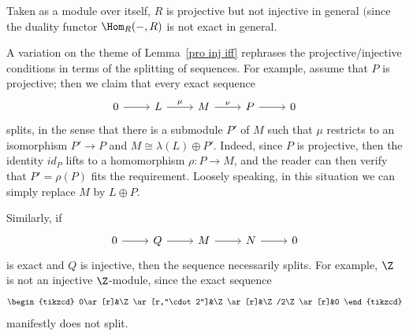 \begin{remark}
Taken as a module over itself, $R$ is projective but not injective in general $($since the duality functor $\Hom_R(-,R)$ is not exact in general.
\end{remark}
A variation on the theme of Lemma~\ref{pro inj iff} rephrases the projective/injective conditions
in terms of the splitting of sequences. For example, assume that $P$ is projective; then we claim that every exact sequence
\[\begin{tikzcd}
0\ar[r]&L\ar[r,"\mu"]&M\ar[r,"\nu"]&P\ar[r]&0
\end{tikzcd}\]
splits, in the sense that there is a submodule $P'$ of $M$ such that $\mu$ restricts to an isomorphism $P'\to P$ and $M\cong\lambda(L)\oplus P'$. Indeed, since $P$ is projective, then the
identity $id_P$ lifts to a homomorphism $\rho:P\to M$, and the reader can then verify that $P'=\rho(P)$ fits the requirement. Loosely speaking, in this situation we can simply replace $M$ by $L\oplus P$.\par
Similarly, if
\[\begin{tikzcd}
0\ar[r]&Q\ar[r]&M\ar[r]&N\ar[r]&0
\end{tikzcd}\]
is exact and $Q$ is injective, then the sequence necessarily splits. For example, $\Z$ is not an injective $\Z$-module, since the exact sequence
\[\begin{tikzcd}
0\ar[r]&\Z\ar[r,"\cdot 2"]&\Z\ar[r]&\Z/2\Z\ar[r]&0
\end{tikzcd}\]
manifestly does not split.
